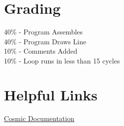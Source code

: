 \documentclass[
	12pt, %
]{fphw}
\begin{document}

\section*{Grading}

40\% - Program Assembles\\
40\% - Program Draws Line\\
10\% - Comments Added\\
10\%  - Loop runs in less than 15 cycles\\



\section*{Helpful Links}
\href{https://github.com/clbx/Cosmic/tree/master/doc}{Cosmic Documentation}\\

\end{document}
